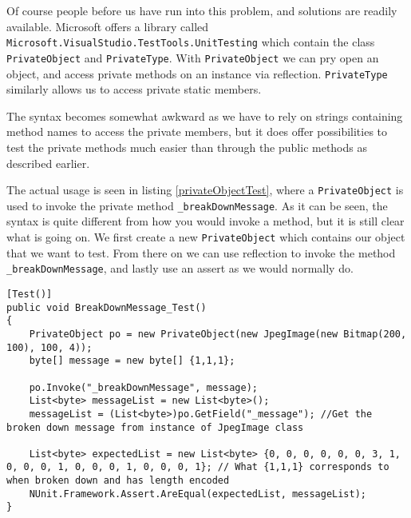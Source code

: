 Of course people before us have run into this problem, and solutions are readily available.
Microsoft offers a library called \lstinline|Microsoft.VisualStudio.TestTools.UnitTesting| which contain the class \lstinline|PrivateObject| and \lstinline|PrivateType|.
With \lstinline|PrivateObject| we can pry open an object, and access private methods on an instance via reflection. \lstinline|PrivateType| similarly allows us to access private static members. 

The syntax becomes somewhat awkward as we have to rely on strings containing method names to access the private members, but it does offer possibilities to test the private methods much easier than through the public methods as described earlier.

The actual usage is seen in listing \ref{privateObjectTest}, where a \lstinline|PrivateObject| is used to invoke the private method \lstinline|_breakDownMessage|. As it can be seen, the syntax is quite different from how you would invoke a method, but it is still clear what is going on. We first create a new \lstinline|PrivateObject| which contains our object that we want to test.  From there on we can use reflection to invoke the method \lstinline|_breakDownMessage|, and lastly use an assert as we would normally do.

\begin{lstlisting}[firstnumber=23,label=privateObjectTest,caption={Example usage of the \lstinline|PrivateObject| class \textbf{File: }JPEGImageTests.cs}]
[Test()]
public void BreakDownMessage_Test()
{
    PrivateObject po = new PrivateObject(new JpegImage(new Bitmap(200, 100), 100, 4));
    byte[] message = new byte[] {1,1,1};

    po.Invoke("_breakDownMessage", message);
    List<byte> messageList = new List<byte>();
    messageList = (List<byte>)po.GetField("_message"); //Get the broken down message from instance of JpegImage class

    List<byte> expectedList = new List<byte> {0, 0, 0, 0, 0, 0, 3, 1, 0, 0, 0, 1, 0, 0, 0, 1, 0, 0, 0, 1}; // What {1,1,1} corresponds to when broken down and has length encoded
    NUnit.Framework.Assert.AreEqual(expectedList, messageList);
}
\end{lstlisting}